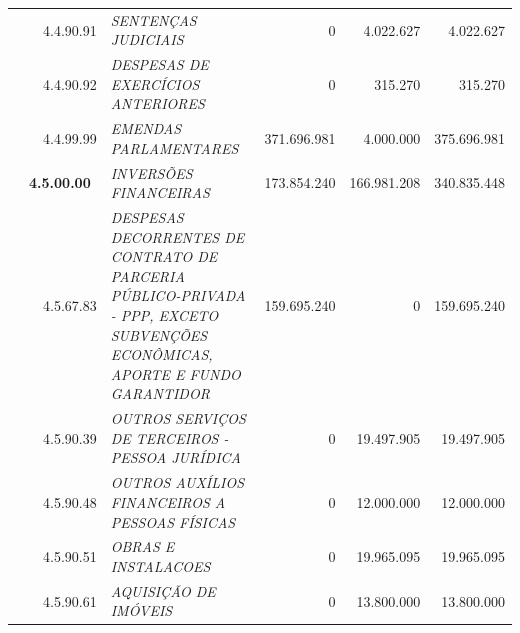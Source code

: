 \documentclass{article}
\begin{document}
\begin{longtable}[c]{m{0.1cm}m{0.1cm}m{0.8cm}|m{8cm}|m{2cm}|m{2cm}|m{2cm}}
\multicolumn{1}{l}{} & \multicolumn{1}{l}{} & \multicolumn{1}{l|}{4.4.90.91} & \multicolumn{1}{L{8cm}|}{\textit{SENTENÇAS JUDICIAIS}} & \multicolumn{1}{r|}{             0} & \multicolumn{1}{r|}{4.022.627} &  \multicolumn{1}{r}{4.022.627}\\
\multicolumn{1}{l}{} & \multicolumn{1}{l}{} & \multicolumn{1}{l|}{4.4.90.92} & \multicolumn{1}{L{8cm}|}{\textit{DESPESAS DE EXERCÍCIOS ANTERIORES}} & \multicolumn{1}{r|}{             0} & \multicolumn{1}{r|}{315.270} &  \multicolumn{1}{r}{315.270}\\
\multicolumn{1}{l}{} & \multicolumn{1}{l}{} & \multicolumn{1}{l|}{4.4.99.99} & \multicolumn{1}{L{8cm}|}{\textit{EMENDAS PARLAMENTARES}} & \multicolumn{1}{r|}{371.696.981} & \multicolumn{1}{r|}{4.000.000} &  \multicolumn{1}{r}{375.696.981}\\
\multicolumn{1}{l}{} & \multicolumn{2}{l|}{\textbf{4.5.00.00}} & \multicolumn{1}{L{8cm}|}{\textit{INVERSÕES FINANCEIRAS}} & \multicolumn{1}{r|}{173.854.240} & \multicolumn{1}{r|}{166.981.208} &  \multicolumn{1}{r}{340.835.448}\\
\multicolumn{1}{l}{} & \multicolumn{1}{l}{} & \multicolumn{1}{l|}{4.5.67.83} & \multicolumn{1}{L{8cm}|}{\textit{DESPESAS DECORRENTES DE CONTRATO DE PARCERIA PÚBLICO-PRIVADA - PPP, EXCETO SUBVENÇÕES ECONÔMICAS, APORTE E FUNDO GARANTIDOR}} & \multicolumn{1}{r|}{159.695.240} & \multicolumn{1}{r|}{             0} &  \multicolumn{1}{r}{159.695.240}\\
\multicolumn{1}{l}{} & \multicolumn{1}{l}{} & \multicolumn{1}{l|}{4.5.90.39} & \multicolumn{1}{L{8cm}|}{\textit{OUTROS SERVIÇOS DE TERCEIROS - PESSOA JURÍDICA}} & \multicolumn{1}{r|}{             0} & \multicolumn{1}{r|}{19.497.905} &  \multicolumn{1}{r}{19.497.905}\\
\multicolumn{1}{l}{} & \multicolumn{1}{l}{} & \multicolumn{1}{l|}{4.5.90.48} & \multicolumn{1}{L{8cm}|}{\textit{OUTROS AUXÍLIOS FINANCEIROS A PESSOAS FÍSICAS}} & \multicolumn{1}{r|}{             0} & \multicolumn{1}{r|}{12.000.000} &  \multicolumn{1}{r}{12.000.000}\\
\multicolumn{1}{l}{} & \multicolumn{1}{l}{} & \multicolumn{1}{l|}{4.5.90.51} & \multicolumn{1}{L{8cm}|}{\textit{OBRAS E INSTALACOES}} & \multicolumn{1}{r|}{             0} & \multicolumn{1}{r|}{19.965.095} &  \multicolumn{1}{r}{19.965.095}\\
\multicolumn{1}{l}{} & \multicolumn{1}{l}{} & \multicolumn{1}{l|}{4.5.90.61} & \multicolumn{1}{L{8cm}|}{\textit{AQUISIÇÃO DE IMÓVEIS}} & \multicolumn{1}{r|}{             0} & \multicolumn{1}{r|}{13.800.000} &  \multicolumn{1}{r}{13.800.000}\\

\end{longtable}
\end{document}
